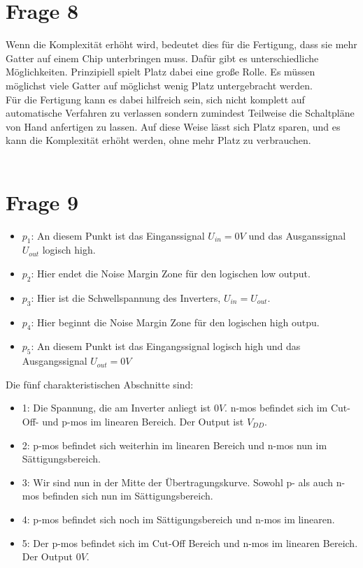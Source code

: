 \documentclass[a4paper]{scrartcl}
\begin{document}
\section*{Frage 8}
Wenn die Komplexität erhöht wird, bedeutet dies für die Fertigung, dass sie mehr Gatter auf einem Chip unterbringen muss. Dafür gibt es unterschiedliche Möglichkeiten. Prinzipiell spielt Platz dabei eine große Rolle. Es müssen möglichst viele Gatter auf möglichst wenig Platz untergebracht werden.\\
Für die Fertigung kann es dabei hilfreich sein, sich nicht komplett auf automatische Verfahren zu verlassen sondern zumindest Teilweise die Schaltpläne von Hand anfertigen zu lassen. Auf diese Weise lässt sich Platz sparen, und es kann die Komplexität erhöht werden, ohne mehr Platz zu verbrauchen.
~\\
~\\
\section*{Frage 9}
\begin{itemize}
	\item $p_1$: An diesem Punkt ist das Einganssignal $U_{in} = 0V$ und das Ausganssignal $U_{out}$ logisch high.
	\item $p_2$: Hier endet die Noise Margin Zone für den logischen low output.
	\item $p_3$: Hier ist die Schwellspannung des Inverters, $U_{in} = U_{out}$.
	\item $p_4$: Hier beginnt die Noise Margin Zone für den logischen high outpu.
	\item $p_5$: An diesem Punkt ist das Eingangssignal logisch high und das Ausgangssignal $U_{out} = 0V$
\end{itemize}

Die fünf charakteristischen Abschnitte sind: 
\begin{itemize}
	\item 1: Die Spannung, die am Inverter anliegt ist $0V$. n-mos befindet sich im Cut-Off- und p-mos im linearen Bereich. Der Output ist $V_{DD}$.
	\item 2: p-mos befindet sich weiterhin im linearen Bereich und n-mos nun im Sättigungsbereich.
	\item 3: Wir sind nun in der Mitte der Übertragungskurve. Sowohl p- als auch n-mos befinden sich nun im Sättigungsbereich.
	\item 4: p-mos befindet sich noch im Sättigungsbereich und n-mos im linearen.
	\item 5: Der p-mos befindet sich im Cut-Off Bereich und n-mos im linearen Bereich. Der Output $0V$.
\end{itemize}
~\\
~\\
\end{document}
